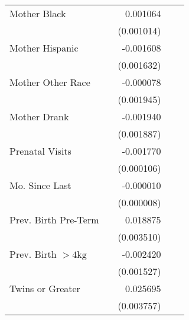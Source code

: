 \begin{table}[h!]
{\begin{tabular}{l*{4}{D{.}{.}{-1}}}
Mother Black        &                     &    0.001064         &                     &                     \\
                    &                     &  (0.001014)         &                     &                     \\
Mother Hispanic     &                     &   -0.001608         &                     &                     \\
                    &                     &  (0.001632)         &                     &                     \\
Mother Other Race   &                     &   -0.000078         &                     &                     \\
                    &                     &  (0.001945)         &                     &                     \\
Mother Drank        &                     &   -0.001940         &                     &                     \\
                    &                     &  (0.001887)         &                     &                     \\
Prenatal Visits     &                     &   -0.001770\sym{***}&                     &                     \\
                    &                     &  (0.000106)         &                     &                     \\
Mo. Since Last      &                     &   -0.000010         &                     &                     \\
                    &                     &  (0.000008)         &                     &                     \\
Prev. Birth Pre-Term&                     &    0.018875\sym{***}&                     &                     \\
                    &                     &  (0.003510)         &                     &                     \\
Prev. Birth $>4\text{kg}$&                     &   -0.002420         &                     &                     \\
                    &                     &  (0.001527)         &                     &                     \\
Twins or Greater    &                     &    0.025695\sym{***}&                     &                     \\
                    &                     &  (0.003757)         &                     &                     \\

\end{tabular}}
\end{table}
